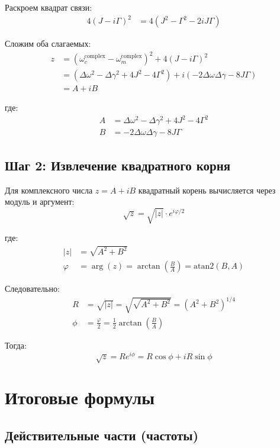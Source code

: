 \documentclass[12pt,a4paper]{article}
\begin{document}
Раскроем квадрат связи:
\begin{align}
4(J - i\Gamma)^2 &= 4(J^2 - \Gamma^2 - 2iJ\Gamma)
\end{align}

Сложим оба слагаемых:
\begin{align}
z &= (\omega_c^{\text{complex}} - \omega_m^{\text{complex}})^2 + 4(J - i\Gamma)^2 \nonumber \\
&= (\Delta\omega^2 - \Delta\gamma^2 + 4J^2 - 4\Gamma^2) + i(-2\Delta\omega\Delta\gamma - 8J\Gamma) \nonumber \\
&= A + iB
\end{align}

где:
\begin{align}
A &= \Delta\omega^2 - \Delta\gamma^2 + 4J^2 - 4\Gamma^2 \\
B &= -2\Delta\omega\Delta\gamma - 8J\Gamma
\end{align}

\subsection{Шаг 2: Извлечение квадратного корня}

Для комплексного числа $z = A + iB$ квадратный корень вычисляется через модуль и аргумент:
\begin{equation}
\sqrt{z} = \sqrt{|z|} \cdot e^{i\varphi/2}
\end{equation}

где:
\begin{align}
|z| &= \sqrt{A^2 + B^2} \\
\varphi &= \arg(z) = \arctan\left(\frac{B}{A}\right) = \text{atan2}(B, A)
\end{align}

Следовательно:
\begin{align}
R &= \sqrt{|z|} = \sqrt{\sqrt{A^2 + B^2}} = (A^2 + B^2)^{1/4} \\
\phi &= \frac{\varphi}{2} = \frac{1}{2}\arctan\left(\frac{B}{A}\right)
\end{align}

Тогда:
\begin{equation}
\sqrt{z} = R e^{i\phi} = R\cos\phi + iR\sin\phi
\end{equation}

\section{Итоговые формулы}

\subsection{Действительные части (частоты)}
\end{document}
